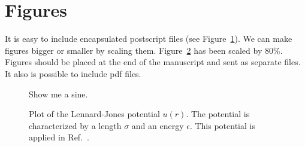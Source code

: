 \documentclass[a4paper,10pt,extramargin]{tubsartcl}
\begin{document}
\newpage
\section*{Figures}
It is easy to include encapsulated postscript files (see Figure~\ref{fig:sine}). We can make figures bigger or smaller by scaling them. Figure~\ref{fig:lj} has been scaled by 80\%.
Figures should be placed at the end of the manuscript and sent as separate files. It also is possible to include pdf files.

\begin{figure}[h]
\begin{center}
\caption{\label{fig:sine}Show me a sine.}
\end{center}
\end{figure}

\begin{figure}[h]
\begin{center}
\caption{\label{fig:lj}Plot of the
Lennard-Jones potential
$u(r)$. The potential is characterized by a length
$\sigma$ and an energy
$\epsilon$. This potential is applied in Ref.~.}
\end{center}
\end{figure}
\end{document}
